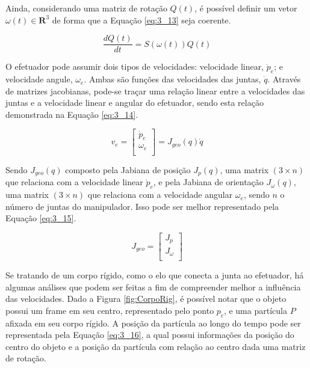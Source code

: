 Ainda, considerando uma matriz de rotação $Q(t)$, é possível definir um vetor $\omega(t)\in \mathbf{R}^3$ de forma que a Equação \ref{eq:3_13} seja coerente.

\begin{equation}
\frac{dQ(t)}{dt} = S(\omega(t)) Q(t)
\label{eq:3_13}
\end{equation}

O efetuador pode assumir dois tipos de velocidades: velocidade linear, $\dot{p}_e$; e velocidade angule, $\omega_e$. Ambas são funções das velocidades das juntas, $\dot{q}$. Através de matrizes jacobianas, pode-se traçar uma relação linear entre a velocidades das juntas e a velocidade linear e angular do efetuador, sendo esta relação demonstrada na Equação \ref{eq:3_14}.

\begin{equation}
v_e = 
\begin{bmatrix}
\dot{p}_e\\
\omega_e\\
\end{bmatrix} = J_{geo}(q)\dot{q}
\label{eq:3_14}
\end{equation}

Sendo $J_{geo}(q)$ composto pela Jabiana de posição $J_p(q)$, uma matrix $(3 \times n)$ que relaciona com a velocidade linear $\dot{p}_e$, e pela Jabiana de orientação $J_{\omega}(q)$, uma matrix $(3 \times n)$ que relaciona com a velocidade angular $\omega_e$, sendo $n$ o número de juntas do manipulador. Isso pode ser melhor representado pela Equação \ref{eq:3_15}.

\begin{equation}
J_{geo} = 
\begin{bmatrix}
J_p\\
J_{\omega}\\
\end{bmatrix}
\label{eq:3_15}
\end{equation}

Se tratando de um corpo rígido, como o elo que conecta a junta ao efetuador, há algumas análises que podem ser feitas a fim de compreender melhor a influência das velocidades. Dado a Figura \ref{fig:CorpoRig}, é possível notar que o objeto possui um frame em seu centro, representado pelo ponto $p_c$, e uma partícula $P$ afixada em seu corpo rígido. A posição da partícula ao longo do tempo pode ser representada pela Equação \ref{eq:3_16}, a qual possui informações da posição do centro do objeto e a posição da partícula com relação ao centro dada uma matriz de rotação.

